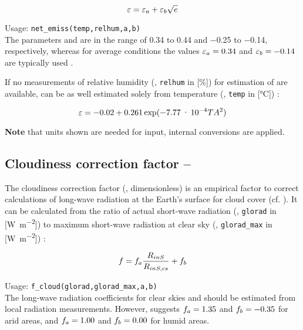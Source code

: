 \begin{equation}\label{eqn:meteo:emis_1}
\varepsilon{} = \varepsilon_a + \varepsilon_b \sqrt{e{}}
\end{equation}

\noindent
Usage:
\verb!net_emiss(temp,relhum,a,b)!\\

The parameters \emisa{} and \emisb{} are in the range of \num{0.34} to \num{0.44} and \num{-0.25} to \num{-0.14}, respectively, whereas for average conditions the values $\varepsilon_a = \num{0.34}$ and $\varepsilon_b = \num{-0.14}$ are typically used \citep{Maidment1993}.

If no measurements of relative humidity (\relHumidity{}, \verb!relhum! in [\si{\percent}]) for estimation of \vaporPressure{} are available, \emissivity{} can be as well estimated solely from temperature (\airtemp{}, \verb!temp! in [\si{\degreeCelsius}]) \citep{Maidment1993}:

\begin{equation}\label{eqn:meteo:emis_2}
\varepsilon{} = -0.02 + 0.261 \exp(\num{-7.77e-4} TA{}^2)
\end{equation}

\textbf{Note} that units shown are needed for input, internal conversions are applied.


\subsection{Cloudiness correction factor -- \cloudCorrFac} \label{sec:meteo:cloudcorr}
The cloudiness correction factor (\cloudCorrFac{}, dimensionless) is an empirical factor to correct calculations of long-wave radiation at the Earth's surface for cloud cover (cf. ). It can be calculated from the ratio of actual short-wave radiation (\radShortwaveIn{}, \verb!glorad! in [\si{\watt\per\metre\squared}]) to maximum short-wave radiation at clear sky (\radShortwaveInClearsky{}, \verb!glorad_max! in [\si{\watt\per\metre\squared}]) \citep{Maidment1993}:

\begin{equation}\label{eqn:meteo:cloudcorr}
f{} = f_a \frac{R_{inS}{}}{R_{inS,cs}{}} + f_b
\end{equation}

\noindent
Usage:
\verb!f_cloud(glorad,glorad_max,a,b)!\\

The long-wave radiation coefficients for clear skies \cloudCorrFacA{} and \cloudCorrFacB{} should be estimated from local radiation measurements. However, \citet{Maidment1993} suggests $f_a = \num{1.35}$ and $f_b = \num{-0.35}$ for arid areas, and $f_a = \num{1.00}$ and $f_b = \num{0.00}$ for humid areas.

